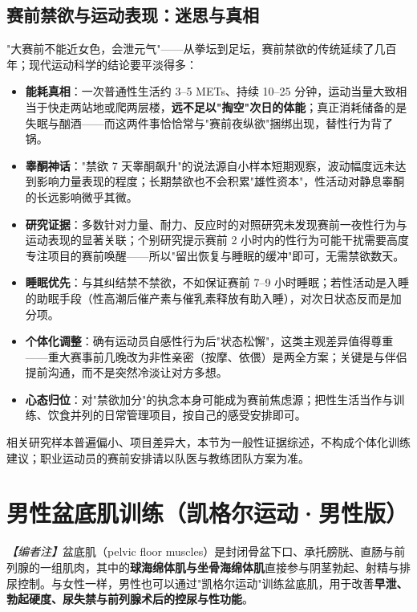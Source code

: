 \subsection{赛前禁欲与运动表现：迷思与真相}

"大赛前不能近女色，会泄元气"——从拳坛到足坛，赛前禁欲的传统延续了几百年；现代运动科学的结论要平淡得多：

\begin{itemize}[leftmargin=2cm]
	\item \textbf{能耗真相}：一次普通性生活约 3--5 METs、持续 10--25 分钟，运动当量大致相当于快走两站地或爬两层楼，\textbf{远不足以"掏空"次日的体能}；真正消耗储备的是失眠与酗酒——而这两件事恰恰常与"赛前夜纵欲"捆绑出现，替性行为背了锅。
	\item \textbf{睾酮神话}："禁欲 7 天睾酮飙升"的说法源自小样本短期观察，波动幅度远未达到影响力量表现的程度；长期禁欲也不会积累"雄性资本"，性活动对静息睾酮的长远影响微乎其微。
	\item \textbf{研究证据}：多数针对力量、耐力、反应时的对照研究未发现赛前一夜性行为与运动表现的显著关联；个别研究提示赛前 2 小时内的性行为可能干扰需要高度专注项目的赛前唤醒——所以"留出恢复与睡眠的缓冲"即可，无需禁欲数天。
	\item \textbf{睡眠优先}：与其纠结禁不禁欲，不如保证赛前 7--9 小时睡眠；若性活动是入睡的助眠手段（性高潮后催产素与催乳素释放有助入睡），对次日状态反而是加分项。
	\item \textbf{个体化调整}：确有运动员自感性行为后"状态松懈"，这类主观差异值得尊重——重大赛事前几晚改为非性亲密（按摩、依偎）是两全方案；关键是与伴侣提前沟通，而不是突然冷淡让对方多想。
	\item \textbf{心态归位}：对"禁欲加分"的执念本身可能成为赛前焦虑源；把性生活当作与训练、饮食并列的日常管理项目，按自己的感受安排即可。
\end{itemize}

\begin{tcolorbox}[colback=pink!5!white,colframe=red!50!black,title=贴心小叮咛]
相关研究样本普遍偏小、项目差异大，本节为一般性证据综述，不构成个体化训练建议；职业运动员的赛前安排请以队医与教练团队方案为准。
\end{tcolorbox}

\section{男性盆底肌训练（凯格尔运动·男性版）}

\noindent\textit{【编者注】}盆底肌（pelvic floor muscles）是封闭骨盆下口、承托膀胱、直肠与前列腺的一组肌肉，其中的\textbf{球海绵体肌与坐骨海绵体肌}直接参与阴茎勃起、射精与排尿控制。与女性一样，男性也可以通过"凯格尔运动"训练盆底肌，用于改善\textbf{早泄、勃起硬度、尿失禁与前列腺术后的控尿与性功能}。

